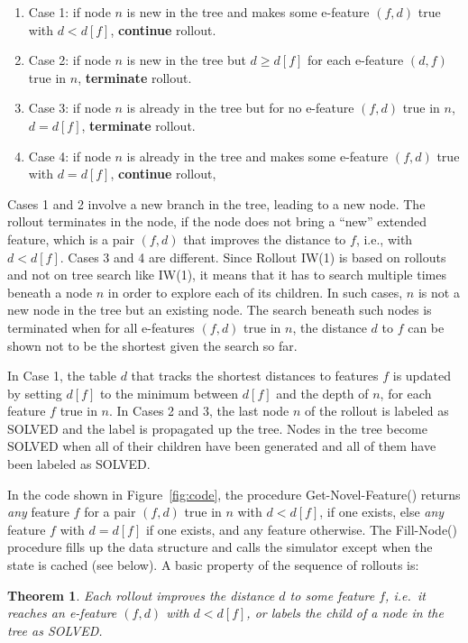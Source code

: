 \documentclass[letterpaper]{article}
\newtheorem{theorem}[definition]{Theorem}
\begin{document}
\begin{enumerate}[$\bullet$]
\item Case 1: if node $n$ is new in the tree and makes some e-feature $(f,d)$ true with $d < d[f]$, \textbf{continue} rollout.
\item Case 2: if node $n$ is new in the tree but $d \geq d[f]$ for each e-feature $(d,f)$ true in $n$, \textbf{terminate} rollout.
\item Case 3: if node $n$ is already in the tree but for no e-feature $(f,d)$ true in $n$, $d = d[f]$, \textbf{terminate} rollout.
\item Case 4: if node $n$ is already in the tree and makes some e-feature $(f,d)$ true with $d = d[f]$, \textbf{continue} rollout,
\end{enumerate}

Cases 1 and 2 involve a  new branch in the tree, leading to a new node. The rollout terminates in the node, if the node  does not bring
a ``new'' extended feature, which is a pair $(f,d)$ that improves the distance to $f$, i.e., with  $d < d[f]$.
Cases 3 and 4 are different. Since Rollout IW(1) is based on rollouts and not on  tree search like IW(1), it means
that it has to search multiple times beneath a node $n$ in order to explore each of its children.
In such cases, $n$ is not a new node in the tree but an existing  node.
The  search beneath such  nodes is  terminated when for all e-features $(f,d)$ true in $n$,
the distance $d$ to $f$ can be shown not to be the shortest  given the search so far.

In Case 1, the table $d$ that tracks the shortest distances to features $f$ is updated
by setting $d[f]$ to  the minimum between  $d[f]$ and the depth of  $n$, for each feature $f$ true in $n$.
In Cases 2 and 3, the last  node $n$ of the rollout is labeled as SOLVED and the label is propagated
up the tree. Nodes  in the tree become  SOLVED when all of their children have been
generated and all of them have been labeled as SOLVED.

In the code shown in  Figure~\ref{fig:code}, the procedure
Get-Novel-Feature() returns \emph{any}  feature $f$ for a pair $(f,d)$ true in $n$
with $d < d[f]$,  if one exists, else  \emph{any}  feature $f$ with  $d=d[f]$ if one exists,
and any feature otherwise.  The Fill-Node() procedure fills up the data structure and
calls  the simulator except when the state is cached (see below).
A basic property of the sequence of rollouts is:

\begin{theorem}
\label{thm:1}
Each rollout improves the distance $d$ to some feature $f$, i.e.\ it reaches an e-feature $(f,d)$
with $d < d[f]$, or labels the child of a node in the tree as SOLVED.
\end{theorem}
\end{document}
